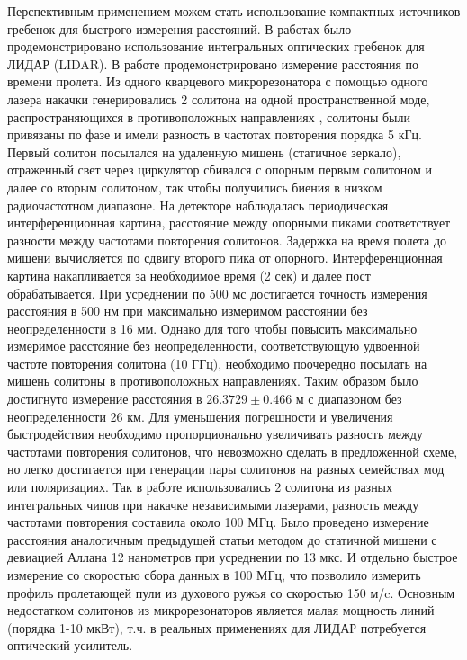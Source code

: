 Перспективным применением можем стать использование компактных источников гребенок для быстрого измерения расстояний. В работах \cite{Trocha887,Suh884} было продемонстрировано использование интегральных оптических гребенок для ЛИДАР (LIDAR). В работе \cite{Suh884} продемонстрировано измерение расстояния по времени пролета. Из одного кварцевого микрорезонатора с помощью одного лазера накачки генерировались 2 солитона на одной пространственной моде, распространяющихся в противоположных направлениях \cite{Yang2017cps}, солитоны были привязаны по фазе и имели разность в частотах повторения порядка 5 кГц. Первый солитон посылался на удаленную мишень (статичное зеркало), отраженный свет через циркулятор сбивался с опорным первым солитоном и далее со вторым солитоном, так чтобы получились биения в низком радиочастотном диапазоне. На детекторе наблюдалась периодическая интерференционная картина, расстояние между опорными пиками соответствует разности между частотами повторения солитонов. Задержка на время полета до мишени вычисляется по сдвигу второго пика от опорного. Интерференционная картина накапливается за необходимое время (2 сек) и далее пост обрабатывается. При усреднении по 500 мс достигается точность измерения расстояния в 500 нм при максимально измеримом расстоянии без неопределенности в 16 мм. Однако для того чтобы повысить максимально измеримое расстояние без неопределенности, соответствующую удвоенной частоте повторения солитона (10 ГГц), необходимо поочередно посылать на мишень солитоны в противоположных направлениях. Таким образом было достигнуто измерение расстояния в $26.3729\pm0.466$ м с диапазоном без неопределенности 26 км. Для уменьшения погрешности и увеличения быстродействия необходимо пропорционально увеличивать разность между частотами повторения солитонов, что невозможно сделать в предложенной схеме, но легко достигается при генерации пары солитонов на разных семействах мод или поляризациях. Так в работе \cite{Trocha887} использовались 2 солитона из разных интегральных чипов при накачке независимыми лазерами, разность между частотами повторения составила около 100 МГц. Было проведено измерение расстояния аналогичным предыдущей статьи методом до статичной мишени с девиацией Аллана 12 нанометров при усреднении по 13 мкс. И отдельно быстрое измерение со скоростью сбора данных в 100 МГц, что позволило измерить профиль пролетающей пули из духового ружья со скоростью 150 м/c. Основным недостатком солитонов из микрорезонаторов является малая мощность линий (порядка 1-10 мкВт), т.ч. в реальных применениях для ЛИДАР потребуется оптический усилитель.

